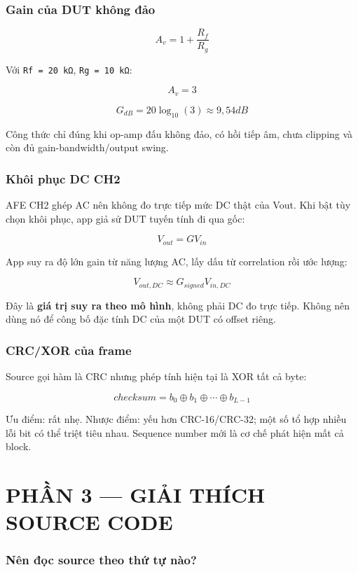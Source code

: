 \documentclass[12pt,a4paper,oneside]{article}
\newcommand{\inlinecode}[1]{\texttt{#1}}
\begin{document}
\section{Gain của DUT không đảo}

\[
A_v=1+\frac{R_f}{R_g}
\]

Với \inlinecode{Rf = 20 kΩ}, \inlinecode{Rg = 10 kΩ}:

\[
A_v=3
\]

\[
G_{dB}=20\log_{10}(3)\approx9,54dB
\]

Công thức chỉ đúng khi op-amp đấu không đảo, có hồi tiếp âm, chưa clipping và còn đủ gain-bandwidth/output swing.

\section{Khôi phục DC CH2}

AFE CH2 ghép AC nên không đo trực tiếp mức DC thật của Vout. Khi bật tùy chọn khôi phục, app giả sử DUT tuyến tính đi qua gốc:

\[
V_{out}=G V_{in}
\]

App suy ra độ lớn gain từ năng lượng AC, lấy dấu từ correlation rồi ước lượng:

\[
V_{out,DC}\approx G_{signed}V_{in,DC}
\]

Đây là \textbf{giá trị suy ra theo mô hình}, không phải DC đo trực tiếp. Không nên dùng nó để công bố đặc tính DC của một DUT có offset riêng.

\section{CRC/XOR của frame}

Source gọi hàm là CRC nhưng phép tính hiện tại là XOR tất cả byte:

\[
checksum=b_0\oplus b_1\oplus\cdots\oplus b_{L-1}
\]

Ưu điểm: rất nhẹ. Nhược điểm: yếu hơn CRC-16/CRC-32; một số tổ hợp nhiều lỗi bit có thể triệt tiêu nhau. Sequence number mới là cơ chế phát hiện mất cả block.

\clearpage

\clearpage
\part{PHẦN 3 — GIẢI THÍCH SOURCE CODE}
\setcounter{section}{0}

\section{Nên đọc source theo thứ tự nào?}
\end{document}
